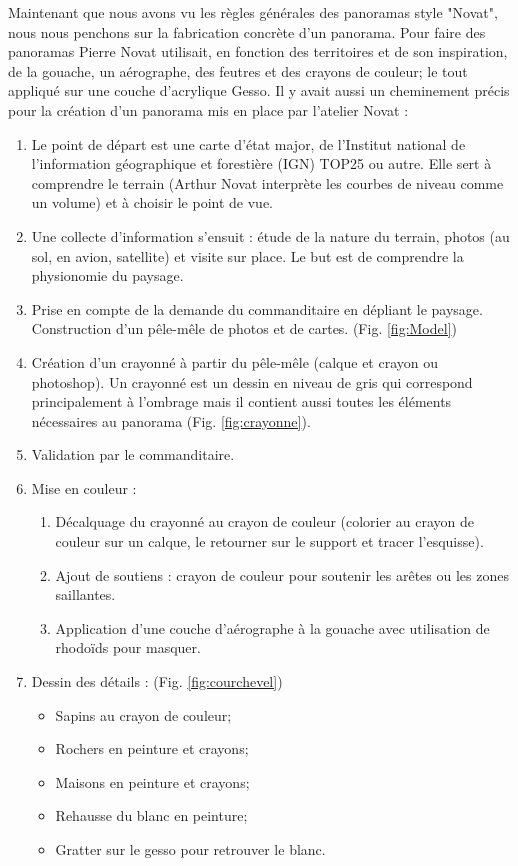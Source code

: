 Maintenant que nous avons vu les règles générales des panoramas style "Novat", nous nous penchons sur la fabrication concrète d'un panorama. Pour faire des panoramas Pierre Novat utilisait, en fonction des territoires et de son inspiration, de la gouache, un aérographe, des feutres et des crayons de couleur; le tout appliqué sur une couche d'acrylique Gesso. Il y avait aussi un cheminement précis pour la création d'un panorama mis en place par l'atelier Novat : 
\begin{enumerate}
\item Le point de départ est une carte d'état major, de l'Institut national de l'information géographique et forestière (IGN) TOP25 ou autre. Elle sert à comprendre le terrain (Arthur Novat interprète les courbes de niveau comme un volume) et à choisir le point de vue.
\item Une collecte d'information s'ensuit : étude de la nature du terrain, photos (au sol, en avion, satellite) et visite sur place. Le but est de comprendre la physionomie du paysage. 
\item Prise en compte de la demande du commanditaire en dépliant le paysage. Construction d'un pêle-mêle de photos et de cartes. (Fig. \ref{fig:Model})
\item Création d'un crayonné à partir du pêle-mêle (calque et crayon ou photoshop). Un crayonné est un dessin en niveau de gris qui correspond principalement à l'ombrage mais il contient aussi toutes les éléments nécessaires au panorama (Fig. \ref{fig:crayonne}).
\item Validation par le commanditaire.
\item Mise en couleur :
\begin{enumerate}
\item Décalquage du crayonné au crayon de couleur (colorier au crayon de couleur sur un calque, le retourner sur le support et tracer l'esquisse).
\item Ajout de soutiens : crayon de couleur pour soutenir les arêtes ou les zones saillantes. 
\item Application d'une couche d'aérographe à la gouache avec utilisation de rhodoïds pour masquer.
\end{enumerate}
\item Dessin des détails : (Fig. \ref{fig:courchevel})
\begin{itemize}
\baselineskip=10pt
\item Sapins au crayon de couleur;
\item Rochers en peinture et crayons;
\item Maisons en peinture et crayons;
\item Rehausse du blanc en peinture;
\item Gratter sur le gesso pour retrouver le blanc. 
\end{itemize}
\end{enumerate}



